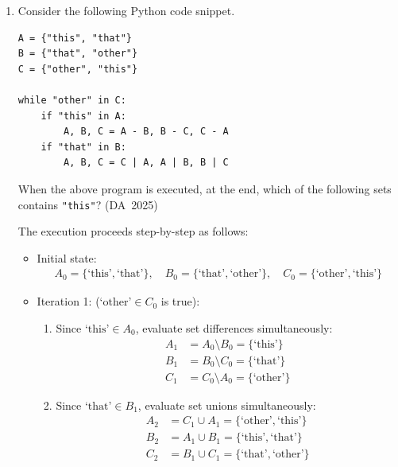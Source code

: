 \begin{enumerate}[label=\thesubsection.\arabic*, ref=\thesubsection.\theenumi]
\item 
Consider the following Python code snippet.
\begin{lstlisting}[frame=single, basicstyle=\rmfamily, xleftmargin=0pt]
A = {"this", "that"}
B = {"that", "other"}
C = {"other", "this"}
	
while "other" in C:
	if "this" in A:
		A, B, C = A - B, B - C, C - A
	if "that" in B:
		A, B, C = C | A, A | B, B | C
\end{lstlisting}
When the above program is executed, at the end, which of the following sets contains \texttt{"this"}?
\hfill (DA~2025)
\begin{enumerate}
	\begin{multicols}{4}
		\item Only A
		\item Only B
		\item Only C
		\item A, C
	\end{multicols}
\end{enumerate}
\solution
The execution proceeds step-by-step as follows:
\begin{itemize}
	\item Initial state:
	\begin{align}
		A_0 = \{\text{`this'}, \text{`that'}\}, \quad B_0 = \{\text{`that'}, \text{`other'}\}, \quad C_0 = \{\text{`other'}, \text{`this'}\}
	\end{align}
	
	\item Iteration 1: ($\text{`other'} \in C_0$ is true):
	\begin{enumerate}
		\item Since $\text{`this'} \in A_0$, evaluate set differences simultaneously:
		\begin{align}
			A_1 &= A_0 \setminus B_0 = \{\text{`this'}\} \\
			B_1 &= B_0 \setminus C_0 = \{\text{`that'}\} \\
			C_1 &= C_0 \setminus A_0 = \{\text{`other'}\}
		\end{align}
		\item Since $\text{`that'} \in B_1$, evaluate set unions simultaneously:
		\begin{align}
			A_2 &= C_1 \cup A_1 = \{\text{`other'}, \text{`this'}\} \\
			B_2 &= A_1 \cup B_1 = \{\text{`this'}, \text{`that'}\} \\
			C_2 &= B_1 \cup C_1 = \{\text{`that'}, \text{`other'}\}
		\end{align}
	\end{enumerate}
	

\end{itemize}
\end{enumerate}
